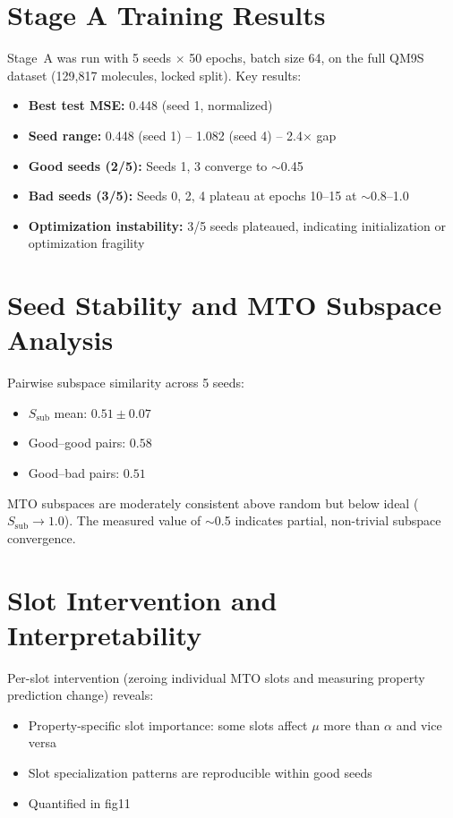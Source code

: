 \documentclass[11pt,a4paper]{article}
\begin{document}
\section{Stage A Training Results}

Stage~A was run with 5 seeds $\times$ 50 epochs, batch size 64, on the full QM9S dataset (129,817 molecules, locked split). Key results:

\begin{itemize}[nosep]
    \item \textbf{Best test MSE:} 0.448 (seed 1, normalized)
    \item \textbf{Seed range:} 0.448 (seed 1) -- 1.082 (seed 4) -- 2.4$\times$ gap
    \item \textbf{Good seeds (2/5):} Seeds 1, 3 converge to $\sim$0.45
    \item \textbf{Bad seeds (3/5):} Seeds 0, 2, 4 plateau at epochs 10--15 at $\sim$0.8--1.0
    \item \textbf{Optimization instability:} 3/5 seeds plateaued, indicating initialization or optimization fragility
\end{itemize}

\section{Seed Stability and MTO Subspace Analysis}

Pairwise subspace similarity across 5 seeds:

\begin{itemize}[nosep]
    \item $S_\text{sub}$ mean: $0.51 \pm 0.07$
    \item Good--good pairs: $0.58$
    \item Good--bad pairs: $0.51$
\end{itemize}

MTO subspaces are moderately consistent above random but below ideal ($S_\text{sub} \to 1.0$). The measured value of $\sim$0.5 indicates partial, non-trivial subspace convergence.

\section{Slot Intervention and Interpretability}

Per-slot intervention (zeroing individual MTO slots and measuring property prediction change) reveals:

\begin{itemize}[nosep]
    \item Property-specific slot importance: some slots affect $\mu$ more than $\alpha$ and vice versa
    \item Slot specialization patterns are reproducible within good seeds
    \item Quantified in fig11
\end{itemize}
\end{document}
